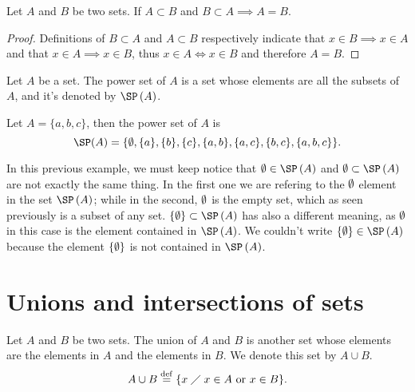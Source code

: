\begin{prop}
    Let $A$ and $B$ be two sets. If $A\subset B$ and $B\subset A\implies A = B$.
\end{prop}
\begin{proof}
    Definitions of $B\subset A$ and $A\subset B$ respectively indicate that $x\in B\implies x\in A$ and that $x\in A\implies x\in B$, thus $x\in A\iff x\in B$ and therefore $A = B$.
\end{proof}

\begin{defi}
    Let $A$ be a set. The power set of $A$ is a set whose elements are all the subsets of $A$, and it's denoted by $\SP\left( A \right) $.
\end{defi}

\begin{example}
    Let $A = \{a, b, c\}$, then the power set of $A$ is
    \begin{equation}
    \SP(A) = \lbrace \O, \{a\}, \{b\}, \{c\}, \{a, b\}, \{a, c\}, \{b, c\}, \{a, b, c\}\rbrace.
    \end{equation}
\end{example}

In this previous example, we must keep notice that $\O\in\SP\left( A \right)$ and $\O\subset \SP\left( A \right)$ are not exactly the same thing. In the first one we are refering to the $\emptyset$ element in the set $\SP\left( A \right)$; while in the second, $\emptyset$ is the empty set, which as seen previously is a subset of any set. $\{\O\}\subset \SP\left( A \right)$ has also a different meaning, as $\emptyset$ in this case is the element contained in $\SP\left( A \right)$. We couldn't write $\{\O\}\in \SP\left( A \right)$ because the element $\{\emptyset\}$ is not contained in $\SP\left( A \right) $.

\section{Unions and intersections of sets}
\begin{defi}
    Let $A$ and $B$ be two sets. The union of $A$ and $B$ is another set whose elements are the elements in $A$ and the elements in $B$. We denote this set by $A\cup B$.
    \begin{equation}
        A\cup B \overset{\mathrm{def}}{=} \{x\;\diagup\; x\in A\textrm{ or } x\in B\}.
    \end{equation}
\end{defi}

